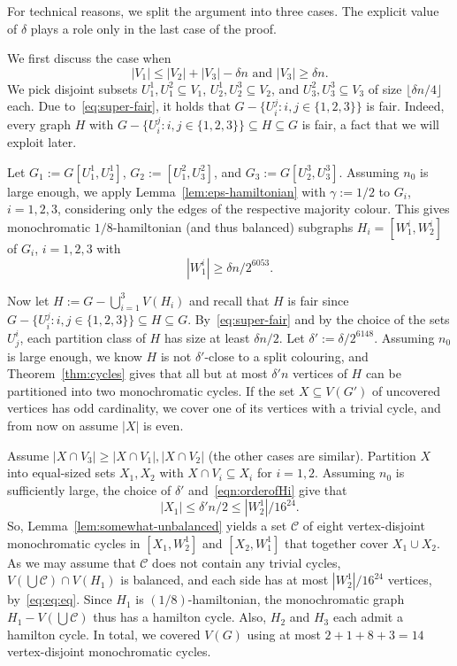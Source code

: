 \documentclass[a4paper,10pt]{article}
\begin{document}
For technical reasons, we  split the argument into three cases.
The explicit value of $\delta$ plays a role only in the last case of the proof.

We first discuss the case when 
\begin{equation}\label{eq:super-fair}
|V_1| \le |V_2| + |V_3| - \delta n \mbox{ and } |V_3| \ge \delta n.
\end{equation}
We pick disjoint subsets $U_1^1,U_1^2 \subseteq V_1$, $U_2^1,U_2^3 \subseteq V_2$, and $U_3^2,U_3^3 \subseteq V_3$ of size $\lfloor \delta n / 4 \rfloor$ each.
Due to~\eqref{eq:super-fair}, it holds that $G - \{U_i^j : i,j \in \{1,2,3\}\}$ is fair.
Indeed, every graph $H$ with $G - \{U_i^j : i,j \in \{1,2,3\}\} \subseteq H \subseteq G$ is fair, a fact that we will exploit later. 

Let $G_1 := G[U_1^1, U_2^1]$, $G_2 := [U_1^2, U_3^2]$, and $G_3 := G[U_2^3, U_3^3]$. Assuming $n_0$ is large enough,
we apply Lemma~\ref{lem:eps-hamiltonian} with $\gamma:=1/2$ to $G_i$, $i=1,2,3$, considering only the edges of the respective majority colour. This gives  monochromatic $1/8$-hamiltonian (and thus balanced) subgraphs $H_i=[W^i_1, W^i_2]$ of $G_i$, $i=1,2,3$ with
\begin{equation}\label{eqn:orderofHi}
|W^i_1|  \ge {\delta n}/{2^{6053}}.
\end{equation}

Now let $H := G - \bigcup_{i=1}^3 V(H_i)$ and recall that $H$ is fair since $G - \{U_i^j : i,j \in \{1,2,3\}\} \subseteq H \subseteq G$.
By~\eqref{eq:super-fair} and by the choice of the sets $U^i_j$, each partition class of $H$ has size at least $\delta n / 2$. Let $\delta':={\delta }/{2^{6148}}$.
Assuming $n_0$ is large enough, we know $H$ is not $\delta'$-close to a split colouring, and Theorem~\ref{thm:cycles} gives that all but at most $\delta' n$ vertices of $H$ can be partitioned into two monochromatic cycles.
If the set $X \subseteq V(G')$ of uncovered vertices has odd cardinality, we cover one of its vertices with a trivial cycle, and from now on assume $|X|$ is even.

Assume $|X \cap V_3| \ge |X \cap V_1|,|X \cap V_2|$ (the other cases are similar).
Partition $X$ into equal-sized sets $X_1,X_2$ with 
$X \cap V_i \subseteq X_i$ for $i=1,2$.
Assuming $n_0$ is sufficiently large, the choice of $\delta'$ and~\eqref{eqn:orderofHi} give that 
\begin{equation}\label{eq:eq:eq}
|X_1|  \le {\delta'n}/{2} \le {|W^1_2|}/{16^{24}}.
\end{equation}
 So, Lemma~\ref{lem:somewhat-unbalanced} yields a set $\mathcal C$ of eight vertex-disjoint monochromatic cycles in $[X_1,W^1_2]$ and $[X_2,W^1_1]$ that together cover $X_1 \cup X_2$.
As we may assume that $\mathcal C$ does not contain any trivial cycles,  $V(\bigcup \mathcal C)\cap V(H_1)$ is balanced, and each side has at most $ {|W^1_2|}/{16^{24}}$ vertices, by~\eqref{eq:eq:eq}.
Since $H_1$ is $(1/8)$-hamiltonian, the monochromatic graph $H_1-V(\bigcup \mathcal C)$ thus has a hamilton cycle.
Also, $H_2$ and $H_3$ each admit a hamilton cycle.
In total, we covered $V(G)$ using at most $2+1+8+3=14$ vertex-disjoint monochromatic cycles.
\medskip
\end{document}
